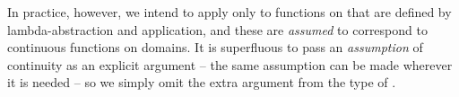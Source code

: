 \begin{AgdaAlign}
In practice, however, we intend to apply  only to functions on 
that are defined by lambda-abstraction and application, 
and these are \emph{assumed} to correspond to continuous functions on domains.
It is superfluous to pass an \emph{assumption} of continuity as an explicit argument
– the same assumption can be made wherever it is needed
– so we simply omit the extra argument from the type of .

\clearpage
\begin{code}%
%
\>[4]\AgdaSymbol{(}\AgdaSpace{}%
%
\>[14]\AgdaSymbol{:}%
\>[17]\AgdaSpace{}%
\AgdaSymbol{)}\<%
\\
%
\>[4]\AgdaSymbol{(}\AgdaSpace{}%
%
\>[14]\AgdaSymbol{:}%
\>[17]\AgdaSpace{}%
\AgdaSpace{}%
\AgdaSpace{}%
\AgdaSpace{}%
\AgdaSpace{}%
\AgdaSymbol{)}\<%
\\
%
\>[4]\AgdaSymbol{(}\AgdaSpace{}%
%
\>[14]\AgdaSymbol{:}%
\>[17]\AgdaSymbol{\{}\AgdaSpace{}%
\AgdaSpace{}%
\AgdaSymbol{:}\AgdaSpace{}%
\AgdaSymbol{\}}\AgdaSpace{}%
\AgdaSpace{}%
\AgdaSpace{}%
\AgdaSpace{}%
\AgdaSpace{}%
\AgdaSpace{}%
\AgdaSpace{}%
\AgdaSpace{}%
\AgdaSpace{}%
\AgdaSpace{}%
\AgdaSpace{}%
\AgdaSymbol{)}\<%
\\
%
\>[4]\AgdaSymbol{(}\AgdaSpace{}%
%
\>[14]\AgdaSymbol{:}%
\>[17]\AgdaSymbol{\{}\AgdaSpace{}%
\AgdaSpace{}%
\AgdaSymbol{:}\AgdaSpace{}%
\AgdaSymbol{\}}\AgdaSpace{}%
\AgdaSpace{}%
\AgdaSpace{}%
\AgdaSpace{}%
\AgdaSpace{}%
\AgdaSpace{}%
\AgdaSpace{}%
\AgdaSpace{}%
\AgdaSpace{}%
\AgdaSpace{}%
\AgdaSpace{}%
\AgdaSymbol{)}\<%
\\
%
\>[4]\AgdaSymbol{(}\AgdaSpace{}%
%
\>[14]\AgdaSymbol{:}%
\>[17]\AgdaSymbol{\{}\AgdaSpace{}%

\end{code}
\end{AgdaAlign}
